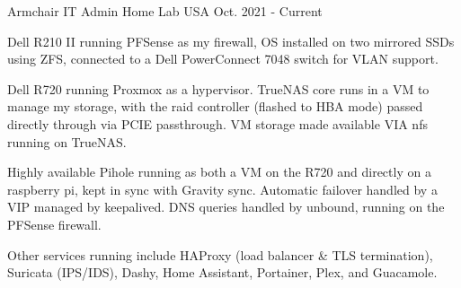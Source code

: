 \begin{cventries}
  \cventry
    {Armchair IT Admin} %
    {Home Lab} %
    {USA} %
    {Oct. 2021 - Current} %
    {
      \begin{cvitems} %
        \item {Dell R210 II running PFSense as my firewall, OS installed on two mirrored SSDs using ZFS, connected to a Dell PowerConnect 7048 switch for VLAN support.}
        \item {Dell R720 running Proxmox as a hypervisor. TrueNAS core runs in a VM to manage my storage, with the raid controller (flashed to HBA mode) passed directly through via PCIE passthrough. VM storage made available VIA nfs running on TrueNAS.}
        \item {Highly available Pihole running as both a VM on the R720 and directly on a raspberry pi, kept in sync with Gravity sync. Automatic failover handled by a VIP managed by keepalived. DNS queries handled by unbound, running on the PFSense firewall.}
        \item {Other services running include HAProxy (load balancer & TLS termination), Suricata (IPS/IDS), Dashy, Home Assistant, Portainer, Plex, and Guacamole.}
      \end{cvitems}
    }

\end{cventries}
